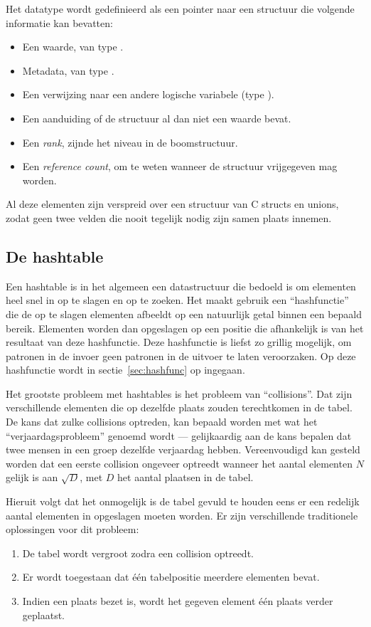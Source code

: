 {Het datatype  wordt gedefinieerd als een pointer naar een structuur die volgende informatie kan bevatten: \begin{itemize}
  \item Een waarde, van type .
  \item Metadata, van type .
  \item Een verwijzing naar een andere logische variabele (type ).
  \item Een aanduiding of de structuur al dan niet een waarde bevat.
  \item Een {\em rank}, zijnde het niveau in de boomstructuur.
  \item Een {\em reference count}, om te weten wanneer de structuur vrijgegeven mag worden.
\end{itemize}
Al deze elementen zijn verspreid over een structuur van C structs en unions, zodat geen twee velden die nooit tegelijk nodig zijn samen plaats innemen.

\subsection{De hashtable} \label{sec:hashtable}

Een hashtable is in het algemeen een datastructuur die bedoeld is om elementen heel snel in op te slagen en op te zoeken. Het maakt gebruik een ``hashfunctie'' die de op te slagen elementen afbeeldt op een natuurlijk getal binnen een bepaald bereik. Elementen worden dan opgeslagen op een positie die afhankelijk is van het resultaat van deze hashfunctie. Deze hashfunctie is liefst zo grillig mogelijk, om patronen in de invoer geen patronen in de uitvoer te laten veroorzaken. Op deze hashfunctie wordt in sectie~\ref{sec:hashfunc} op ingegaan.

Het grootste probleem met hashtables is het probleem van ``collisions''. Dat zijn verschillende elementen die op dezelfde plaats zouden terechtkomen in de tabel. De kans dat zulke collisions optreden, kan bepaald worden met wat het ``verjaardagsprobleem'' genoemd wordt --- gelijkaardig aan de kans bepalen dat twee mensen in een groep dezelfde verjaardag hebben. Vereenvoudigd kan gesteld worden dat een eerste collision ongeveer optreedt wanneer het aantal elementen $N$ gelijk is aan $\sqrt{D}$, met $D$ het aantal plaatsen in de tabel.

Hieruit volgt dat het onmogelijk is de tabel gevuld te houden eens er een redelijk aantal elementen in opgeslagen moeten worden. Er zijn verschillende traditionele oplossingen voor dit probleem: \begin{enumerate}
\item De tabel wordt vergroot zodra een collision optreedt.
\item Er wordt toegestaan dat \'e\'en tabelpositie meerdere elementen bevat.
\item Indien een plaats bezet is, wordt het gegeven element \'e\'en plaats verder geplaatst.
\end{enumerate}

}
